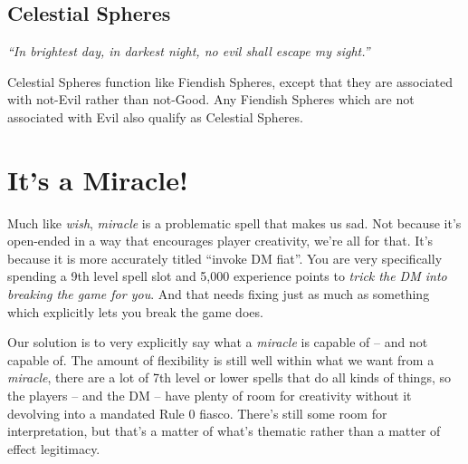 \documentclass[10pt]{report}
\newcommand{\quot}[1]{\emph{#1}\medskip}
\newcommand{\spell}[1]{\emph{#1}}
\newcommand{\itemspace}{\setlength{\itemsep}{-1mm}\setlength{\topsep}{-1mm} }
\begin{document}
\section{Celestial Spheres}
\quot{``In brightest day, in darkest night, no evil shall escape my sight.''}

Celestial Spheres function like Fiendish Spheres, except that they are associated with not-Evil rather than not-Good. Any Fiendish Spheres which are not associated with Evil also qualify as Celestial Spheres.

\newcommand{\sphere}[9]{\begin{list}{}{\itemspace}\item \textbf{1:} \spell{#1} \item \textbf{3:} \spell{#2} \item \textbf{5:} \spell{#3} \item \textbf{7:} \spell{#4} \item \textbf{9:} \spell{#5} \item \textbf{11:} \spell{#6} \item \textbf{13:} \spell{#7} \item \textbf{15:} \spell{#8} \item \textbf{17:} \spell{#9}}
\newcommand{\spherecont}[1]{\item\textbf{19:} \spell{#1} \end{list}\medskip}

\begin{multicols}{2}

\end{multicols}

\chapter{It's a Miracle!}

Much like \spell{wish}, \spell{miracle} is a problematic spell that makes us sad. Not because it's open-ended in a way that encourages player creativity, we're all for that. It's because it is more accurately titled ``invoke DM fiat''. You are very specifically spending a 9th level spell slot and 5,000 experience points to \emph{trick the DM into breaking the game for you}. And that needs fixing just as much as something which explicitly lets you break the game does.

Our solution is to very explicitly say what a \spell{miracle} is capable of -- and not capable of. The amount of flexibility is still well within what we want from a \spell{miracle}, there are a lot of 7th level or lower spells that do all kinds of things, so the players -- and the DM -- have plenty of room for creativity without it devolving into a mandated Rule 0 fiasco. There's still some room for interpretation, but that's a matter of what's thematic rather than a matter of effect legitimacy.
\end{document}

